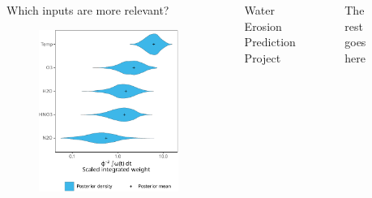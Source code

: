 \documentclass[final]{beamer}
\newlength{\sepwidth}
\newlength{\colwidth}
\newlength{\padwidth}
\newcommand{\separatorcolumn}{\begin{column}{\sepwidth}\end{column}}
\newcommand{\shortlipsum}{{\color{gray!99} \lipsum[1][1-10]}}
\begin{document}
\begin{frame}[t]
\begin{columns}[t]
\begin{column}{\colwidth}
    \begin{block}{Which inputs are more relevant?}
      \begin{figure}
        \centering
        \includegraphics[width=\linewidth]{inc/mls_weight_integral.pdf}
      \end{figure}
    \end{block}
  \end{column}

  \separatorcolumn{}

  \begin{column}{\colwidth}
    \begin{block}{Water Erosion Prediction Project}
      \shortlipsum{}
    \end{block}
  \end{column}

  \separatorcolumn{}

  \begin{column}{\colwidth}
    \begin{block}{The rest goes here}
      \shortlipsum{}
    \end{block}
  \end{column}

  \separatorcolumn{}

  \vrule{}
  \begin{column}{\padwidth}
  \end{column}

\end{columns}
\end{frame}
\end{document}
